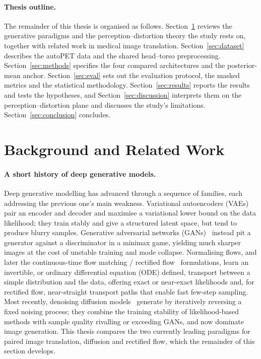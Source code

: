 \documentclass[11pt,a4paper]{article}
\begin{document}
\paragraph{Thesis outline.} The remainder of this thesis is organised as follows.
Section~\ref{sec:background} reviews the generative paradigms and the perception--distortion
theory the study rests on, together with related work in medical image translation.
Section~\ref{sec:dataset} describes the autoPET data and the shared head--torso preprocessing.
Section~\ref{sec:methods} specifies the four compared architectures and the posterior-mean anchor.
Section~\ref{sec:eval} sets out the evaluation protocol, the masked metrics and the statistical
methodology. Section~\ref{sec:results} reports the results and tests the hypotheses, and
Section~\ref{sec:discussion} interprets them on the perception--distortion plane and discusses the
study's limitations. Section~\ref{sec:conclusion} concludes.

\section{Background and Related Work}
\label{sec:background}

\paragraph{A short history of deep generative models.} Deep generative modelling
has advanced through a sequence of families, each addressing the previous one's
main weakness. Variational autoencoders (VAEs)~\parencite{kingma2014vae}
pair an encoder and decoder and maximise a variational lower bound on the data
likelihood; they train stably and give a structured latent space, but tend to
produce blurry samples. Generative adversarial networks
(GANs)~\parencite{goodfellow2014gan} instead pit a generator against a
discriminator in a minimax game, yielding much sharper images at the cost of
unstable training and mode collapse. Normalising flows, and later the
continuous-time flow matching / rectified
flow~\parencite{lipman2023flow, liu2023rectifiedflow} formulations, learn an
invertible, or ordinary differential equation (ODE) defined, transport between a simple
distribution and the data,
offering exact or near-exact likelihoods and, for rectified flow, near-straight
transport paths that enable fast few-step sampling. Most recently,
denoising diffusion models~\parencite{ho2020denoising} generate by
iteratively reversing a fixed noising process; they combine the training
stability of likelihood-based methods with sample quality rivalling or exceeding
GANs, and now dominate image generation. This thesis compares the two currently
leading paradigms for paired image translation, diffusion and rectified
flow, which the remainder of this section develops.
\end{document}
